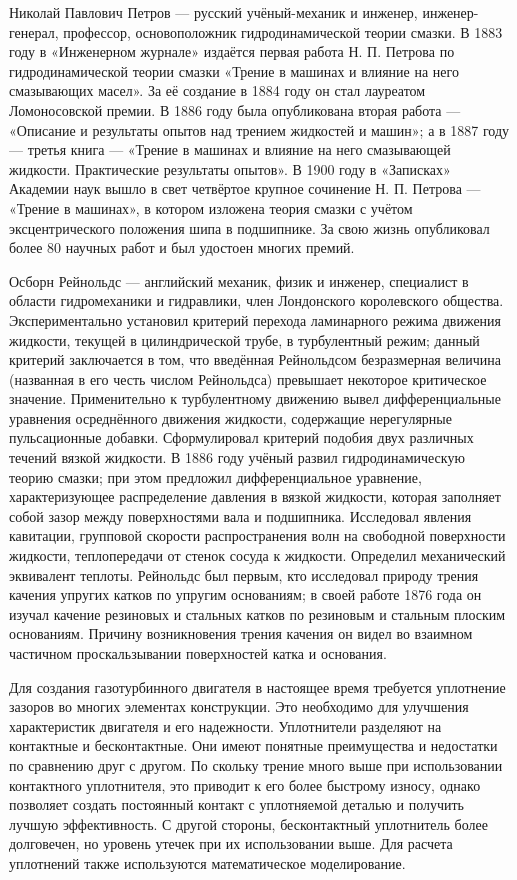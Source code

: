 \documentclass[a4paper,14pt]{extarticle}
\begin{document}
Николай Павлович Петров --- русский учёный-механик и инженер, инженер-генерал, профессор, основоположник гидродинамической теории смазки. В 1883 году в «Инженерном журнале» издаётся первая работа Н. П. Петрова по гидродинамической теории смазки «Трение в машинах и влияние на него смазывающих масел». За её создание в 1884 году он стал лауреатом Ломоносовской премии. В 1886 году была опубликована вторая работа — «Описание и результаты опытов над трением жидкостей и машин»; а в 1887 году — третья книга — «Трение в машинах и влияние на него смазывающей жидкости. Практические результаты опытов». В 1900 году в «Записках» Академии наук вышло в свет четвёртое крупное сочинение Н. П. Петрова — «Трение в машинах», в котором изложена теория смазки с учётом эксцентрического положения шипа в подшипнике. За свою жизнь опубликовал более 80 научных работ и был удостоен многих премий.

\newpage

Осборн Рейнольдс ---  английский механик, физик и инженер, специалист в области гидромеханики и гидравлики, член Лондонского королевского общества. Экспериментально установил критерий перехода ламинарного режима движения жидкости, текущей в цилиндрической трубе, в турбулентный режим; данный критерий заключается в том, что введённая Рейнольдсом безразмерная величина (названная в его честь числом Рейнольдса) превышает некоторое критическое значение. Применительно к турбулентному движению вывел дифференциальные уравнения осреднённого движения жидкости, содержащие нерегулярные пульсационные добавки. Сформулировал критерий подобия двух различных течений вязкой жидкости.
В 1886 году учёный развил гидродинамическую теорию смазки; при этом предложил дифференциальное уравнение, характеризующее распределение давления в вязкой жидкости, которая заполняет собой зазор между поверхностями вала и подшипника.
Исследовал явления кавитации, групповой скорости распространения волн на свободной поверхности жидкости, теплопередачи от стенок сосуда к жидкости. Определил механический эквивалент теплоты.
Рейнольдс был первым, кто исследовал природу трения качения упругих катков по упругим основаниям; в своей работе 1876 года он изучал качение резиновых и стальных катков по резиновым и стальным плоским основаниям. Причину возникновения трения качения он видел во взаимном частичном проскальзывании поверхностей катка и основания.

Для создания газотурбинного двигателя в настоящее время требуется уплотнение зазоров во многих элементах конструкции. Это необходимо для улучшения характеристик двигателя и его надежности. Уплотнители разделяют на контактные и бесконтактные. Они имеют понятные преимущества и недостатки по сравнению друг с другом. По скольку трение много выше при использовании контактного уплотнителя, это приводит к его более быстрому износу, однако позволяет создать постоянный контакт с уплотняемой деталью и получить лучшую эффективность. С другой стороны, бесконтактный уплотнитель более долговечен, но уровень утечек при их использовании выше. Для расчета уплотнений также используются математическое моделирование.
\end{document}
